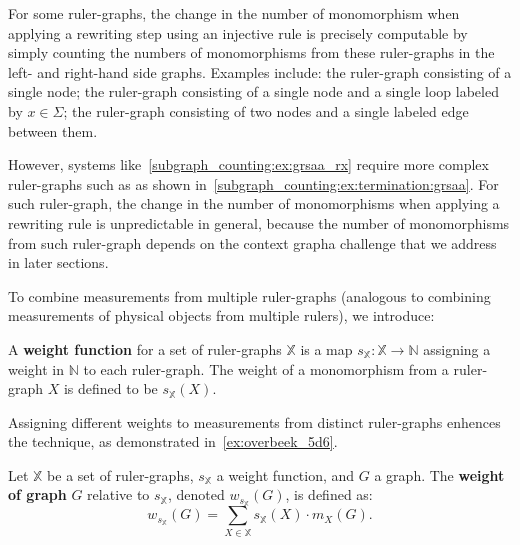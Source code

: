 For some ruler-graphs, the change in the number of monomorphism when applying a rewriting step using an injective rule is precisely computable by simply counting the numbers of monomorphisms from these ruler-graphs in the left- and right-hand side graphs. Examples include: the ruler-graph  consisting of a single node; the ruler-graph  consisting of a single node and a single loop labeled by $x\in \Sigma$; the ruler-graph  consisting of two nodes and a single labeled edge between them.  
    
However, systems like~\autoref{subgraph_counting:ex:grsaa_rx} require more complex ruler-graphs such as  as shown in~\autoref{subgraph_counting:ex:termination:grsaa}.
    For such ruler-graph, the change in the number of monomorphisms when applying a rewriting rule is unpredictable in general, because the number of monomorphisms from such ruler-graph depends on the context graph\textemdash a challenge that we address in later sections.
    
To combine measurements from multiple ruler-graphs (analogous to combining measurements of physical objects from multiple rulers), we introduce:
\begin{definition}
    \label{subgraph_counting:def:weight_function}
    A \textbf{weight function} for a set of ruler-graphs \( \mathbb{X} \) is a map \( s_{\mathbb{X}} \colon \mathbb{X} \to \mathbb{N} \) assigning a weight in $\mathbb{N}$ to each ruler-graph. The weight of a monomorphism from a ruler-graph $X$ is defined to be $s_\mathbb{X}(X)$. 
\end{definition}
Assigning different weights to measurements from distinct ruler-graphs enhences the technique, as demonstrated in~\autoref{ex:overbeek_5d6}.
\begin{definition}
    \label{subgraph_counting:def:graph_weight}  
    Let \( \mathbb{X} \) be a set of ruler-graphs, 
    \( s_{\mathbb{X}} \) a weight function, and \( G \) a graph. The \textbf{weight of graph} \( G \) relative to \( s_{\mathbb{X}} \), denoted \( w_{s_{\mathbb{X}}}(G) \), is defined as: 
    \[
        w_{s_{\mathbb{X}}}(G) = \sum_{X \in \mathbb{X}} s_{\mathbb{X}}(X) \cdot m_X(G).  
    \]  
\end{definition}

